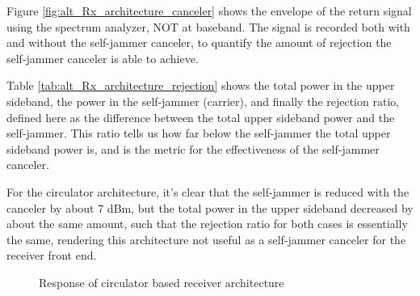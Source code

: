 \documentclass[12pt,onecolumn,titlepage]{article}
\begin{document}
Figure \ref{fig:alt_Rx_architecture_canceler} shows the envelope of the return signal using the spectrum analyzer, NOT at baseband. The signal is recorded both with and without the self-jammer canceler, to quantify the amount of rejection the self-jammer canceler is able to achieve. 

Table \ref{tab:alt_Rx_architecture_rejection} shows the total power in the upper sideband, the power in the self-jammer (carrier), and finally the rejection ratio, defined here as the difference between the total upper sideband power and the self-jammer. This ratio tells us how far below the self-jammer the total upper sideband power is, and is the metric for the effectiveness of the self-jammer canceler.

For the circulator architecture, it's clear that the self-jammer is reduced with the canceler by about 7 dBm, but the total power in the upper sideband decreased by about the same amount, such that the rejection ratio for both cases is essentially the same, rendering this architecture not useful as a self-jammer canceler for the receiver front end.

\begin{figure}[ht]
	\centering
		\quad
	\label{fig:alt_Rx}
	\caption{Response of circulator based receiver architecture}
\end{figure}
\end{document}
